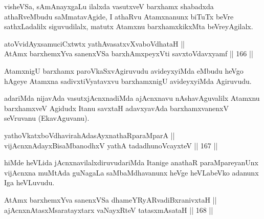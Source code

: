 \begin{artha}
visheVSa, sAmAnayxgaLu ilalxda vasutxveV barxhamx shabadxda
athaRveMbudu saMmatavAgide, I athaRvu Atamxnanunx biTuTx beVre
sathxLadalilx siguvudilalx, matutx Atamxnu barxhamxkikxMta
beVreyAgilalx.
\end{artha}


\begin{shl}
atoV\s vidAyxsamuciCxtwtx yathAvasatxvXvaboVdhataH || \\
AtAmx barxhemxYva sanenxVSa barxhAmxpeyxVti savxtoV\s davxyamf \hfill || 166 ||  
\end{shl}

\begin{artha}
AtamxnigU barxhamx paroVkaSxvAgiruvudu avideyxyiMda eMbudu heVgo
hAgeye Atamxna sadivxtiVyatavxvu barxhamxnigU avideyxyiMda Agiruvudu.
\end{artha}

\begin{artha}
adariMda nijavAda vasutxjAcnxnadiMda ajAcnxnavu nAshavAguvalilx
Atamxnu barxhamxveV Agidudx Itanu savxtaH adavxyavAda barxhamxvanenxV
seVruvanu (EkavAguvanu).
\end{artha}


\begin{shl}
yathoVkatxboVdhavirahAdasAyxnathaRparaMparA || \\
vijAcnxnAdayxBisaMbanodhxV yathA tadadhunoVcayxteV \hfill || 167 ||  
\end{shl}

\begin{artha}
hiMde heVLida jAcnxnavilalxdiruvudariMda Itanige anathaR
paraMpareyanUnx vijAcnxna muMtAda guNagaLa saMbaMdhavanunx heVge
heVLabeVko adanunx Iga heVLuvudu.
\end{artha}

\begin{shl}
AtAmx barxhemxYva sanenxVSa dhameYRyARvadiBxranivxtaH || \\
ajAcnxnAtasxMsaratayxtarx vaNayxRteV tatasxmAsataH \hfill || 168 ||  
\end{shl}


